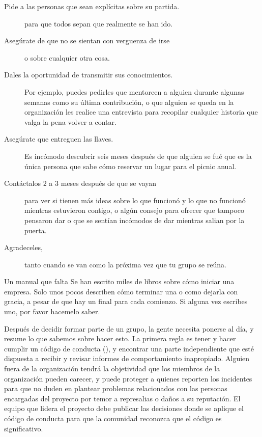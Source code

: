 \begin{description}

\item[Pide a las personas que sean explícitas sobre su partida.]
  para que todos sepan que realmente se han ido.

\item[Asegúrate de que no se sientan con verguenza de irse]
  o sobre cualquier otra cosa.

\item[Dales la oportunidad de transmitir sus conocimientos.]
  Por ejemplo,
  puedes pedirles que mentoreen a alguien durante algunas semanas como su última contribución,
  o que alguien se queda en la organización les realice una entrevista 
  para recopilar cualquier historia que valga la pena volver a contar.

\item[Asegúrate que entreguen las llaves.]
  Es incómodo descubrir seis meses después de que alguien se fué
  que es la única persona que sabe cómo reservar un lugar para el picnic anual.

\item[Contáctalos 2 a 3 meses después de que se vayan]
  para ver si tienen más ideas sobre lo que funcionó y lo que no funcionó mientras estuvieron contigo,
  o algún consejo para ofrecer que tampoco pensaron dar
  o que se sentían incómodos de dar mientras salian por la puerta.

\item[Agradeceles,]
  tanto cuando se van como la próxima vez que tu grupo se reúna.

\end{description}

\begin{aside}{Un manual que falta}
  Se han escrito miles de libros sobre cómo iniciar una empresa.
  Solo unos pocos describen cómo terminar una o como dejarla con gracia,
  a pesar de que hay un final para cada comienzo.
  Si alguna vez escribes uno,
  por favor hacemelo saber.
\end{aside}


Después de decidir formar parte de un grupo,
la gente necesita ponerse al día,
y \cite{Shol2019} resume lo que sabemos sobre hacer esto.
La primera regla es tener y hacer cumplir un código de conducta (),
y encontrar una parte independiente que esté dispuesta a recibir y revisar informes de comportamiento inapropiado.
Alguien fuera de la organización tendrá la objetividad que los miembros de la organización pueden carecer,
y puede proteger a quienes reporten los incidentes para que no duden en plantear problemas relacionados con las personas 
encargadas del proyecto por temor a represalias o daños a su reputación.
El equipo que lidera el proyecto debe publicar las decisiones donde se aplique el código de conducta
para que la comunidad reconozca que el código es significativo.

